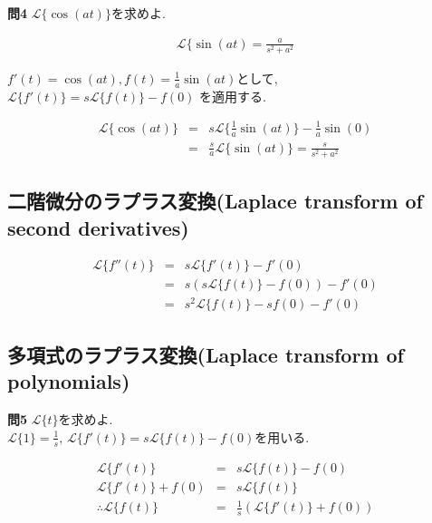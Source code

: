 ﻿\documentclass[a4j]{jarticle}
\begin{document}
\noindent
{\large {\bf 問4}}\/ \( \mathcal{L} \{ \cos(at) \} \)を求めよ.

\begin{eqnarray*}
\mathcal{L} \{ \sin(at) = \frac{a}{s^2+a^2}
\end{eqnarray*}

\( f'(t) = \cos(at), f(t) = \frac{1}{a}\sin(at) \)として, \( \mathcal{L} \{ f'(t) \} = s \mathcal{L} \{ f(t) \} - f(0) \) を適用する.

\begin{eqnarray*}
\mathcal{L} \{ \cos(at) \} &=& s \mathcal{L} \{ \frac{1}{a}\sin(at) \} - \frac{1}{a}\sin(0) \\
                           &=& \frac{s}{a} \mathcal{L} \{ \sin(at) \} = \frac{s}{s^2+a^2}
\end{eqnarray*}

\subsection{二階微分のラプラス変換(Laplace transform of second derivatives)}

\begin{eqnarray*}
\mathcal{L} \{  f''(t) \} &=& s \mathcal{L} \{  f'(t) \} - f'(0) \\
                          &=& s \left( s \mathcal{L} \{  f(t) \} - f(0) \right) - f'(0) \\
                          &=& s^2 \mathcal{L} \{  f(t) \} - s f(0) - f'(0)
\end{eqnarray*}

\subsection{多項式のラプラス変換(Laplace transform of polynomials)}

\noindent
{\large {\bf 問5}}\/ \( \mathcal{L} \{ t \} \)を求めよ. \\

\( \mathcal{L} \{ 1 \} = \frac{1}{s} ,\, \mathcal{L} \{ f'(t) \} = s \mathcal{L} \{ f(t) \} - f(0) \)を用いる.

\begin{eqnarray*}
            \mathcal{L} \{ f'(t) \} &=& s \mathcal{L} \{ f(t) \} - f(0) \\
     \mathcal{L} \{ f'(t) \} + f(0) &=& s \mathcal{L} \{ f(t) \} \\
\therefore \mathcal{L} \{ f(t) \} &=& \frac{1}{s} \left( \mathcal{L} \{ f'(t) \} + f(0) \right)
\end{eqnarray*}
\end{document}

